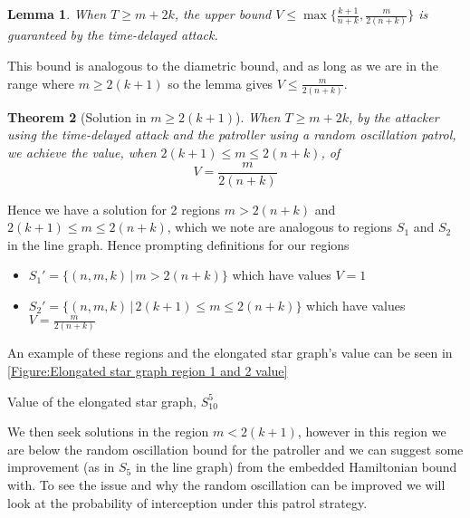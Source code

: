 \documentclass[a4paper,10pt]{article}
\newtheorem{theorem}{Theorem}[section]
\newtheorem{lemma}[theorem]{Lemma}
\theoremstyle{definition}
\theoremstyle{definition}
\theoremstyle{remark}
\theoremstyle{definition}
\begin{document}
\begin{lemma}
When $T \geq m+2k$, the upper bound $V \leq \max \{ \frac{k+1}{n+k} , \frac{m}{2(n+k)}   \}$  is guaranteed by the time-delayed attack.
\end{lemma}

This bound is analogous to the diametric bound, and as long as we are in the range where $m \geq 2(k+1)$ so the lemma gives $V \leq \frac{m}{2(n+k)}$.

\begin{theorem}[Solution in $m \geq 2(k+1)$]
When $T \geq m+2k$, by the attacker using the time-delayed attack and the patroller using a random oscillation patrol, we achieve the value, when $2(k+1) \leq m \leq 2(n+k)$, of
$$V=\frac{m}{2(n+k)}$$
\end{theorem}

Hence we have a solution for 2 regions $m > 2(n+k)$ and $2(k+1) \leq m \leq 2(n+k)$, which we note are analogous to regions $S_{1}$ and $S_{2}$ in the line graph. Hence prompting definitions for our regions

\begin{itemize}
\item $S_{1}' = \{(n,m,k) \, | \, m > 2(n+k) \}$ which have values $V=1$
\item $S_{2}' = \{(n,m,k) \, | \, 2(k+1) \leq m \leq 2(n+k) \}$ which have values $V=\frac{m}{2(n+k)}$
\end{itemize}

An example of these regions and the elongated star graph's value can be seen in \ref{Figure:Elongated star graph region 1 and 2 value}

\begin{myfigure}
\begin{center}

\end{center}
\caption{Value of the elongated star graph, $S_{10}^{5}$}
\label{Figure:Elongated star graph region 1 and 2 value}
\end{myfigure}

We then seek solutions in the region $m < 2(k+1)$, however in this region we are below the random oscillation bound for the patroller and we can suggest some improvement (as in $S_{5}$ in the line graph) from the embedded Hamiltonian bound with. To see the issue and why the random oscillation can be improved we will look at the probability of interception under this patrol strategy.
\end{document}

